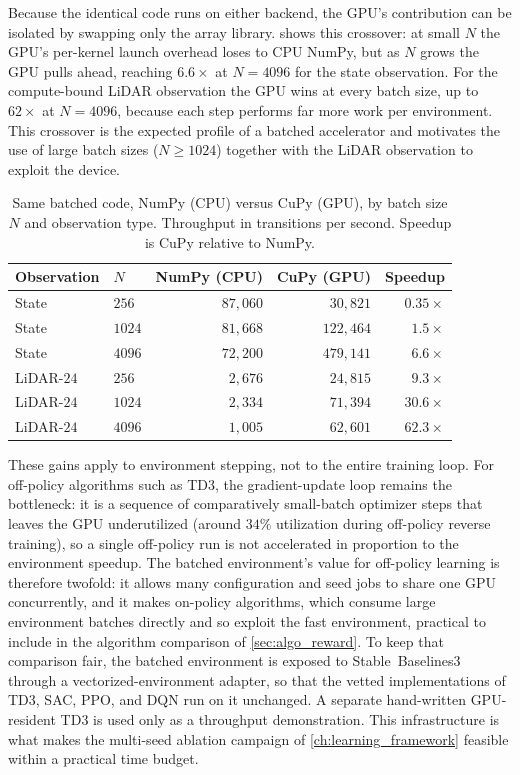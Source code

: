 Because the identical code runs on either backend, the GPU's contribution can be isolated by swapping only the array library.  shows this crossover: at small $N$ the GPU's per-kernel launch overhead loses to CPU NumPy, but as $N$ grows the GPU pulls ahead, reaching $6.6\times$ at $N=4096$ for the state observation. For the compute-bound LiDAR observation the GPU wins at every batch size, up to $62\times$ at $N=4096$, because each step performs far more work per environment. This crossover is the expected profile of a batched accelerator and motivates the use of large batch sizes ($N \geq 1024$) together with the LiDAR observation to exploit the device.

\begin{table}[H]
\centering
\caption{Same batched code, NumPy (CPU) versus CuPy (GPU), by batch size $N$ and observation type. Throughput in transitions per second. Speedup is CuPy relative to NumPy.}
\label{tab:numpy_cupy}
\begin{tabular}{llrrr}
\toprule
Observation & $N$ & NumPy (CPU) & CuPy (GPU) & Speedup \\
\midrule
State      & $256$  & $87{,}060$ & $30{,}821$  & $0.35\times$ \\
State      & $1024$ & $81{,}668$ & $122{,}464$ & $1.5\times$ \\
State      & $4096$ & $72{,}200$ & $479{,}141$ & $6.6\times$ \\
LiDAR-$24$ & $256$  & $2{,}676$  & $24{,}815$  & $9.3\times$ \\
LiDAR-$24$ & $1024$ & $2{,}334$  & $71{,}394$  & $30.6\times$ \\
LiDAR-$24$ & $4096$ & $1{,}005$  & $62{,}601$  & $62.3\times$ \\
\bottomrule
\end{tabular}
\end{table}

These gains apply to environment stepping, not to the entire training loop. For off-policy algorithms such as TD3, the gradient-update loop remains the bottleneck: it is a sequence of comparatively small-batch optimizer steps that leaves the GPU underutilized (around $34\%$ utilization during off-policy reverse training), so a single off-policy run is not accelerated in proportion to the environment speedup. The batched environment's value for off-policy learning is therefore twofold: it allows many configuration and seed jobs to share one GPU concurrently, and it makes on-policy algorithms, which consume large environment batches directly and so exploit the fast environment, practical to include in the algorithm comparison of \cref{sec:algo_reward}. To keep that comparison fair, the batched environment is exposed to Stable~Baselines3~\cite{raffin2021sb3} through a vectorized-environment adapter, so that the vetted implementations of TD3, SAC, PPO, and DQN run on it unchanged. A separate hand-written GPU-resident TD3 is used only as a throughput demonstration. This infrastructure is what makes the multi-seed ablation campaign of \cref{ch:learning_framework} feasible within a practical time budget.
